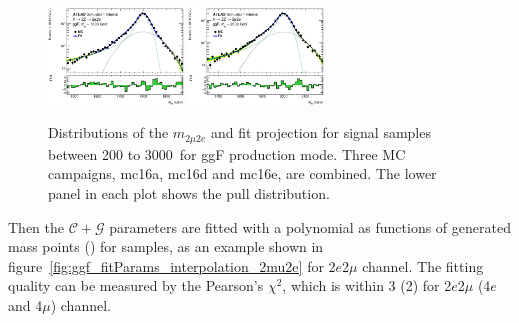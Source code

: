 \begin{figure}[htbp]
    \includegraphics[width=0.32\textwidth]{figures/HMHZZ/signal/ggf_mass_signal_1800_H4l_2mu2e.eps}
    \includegraphics[width=0.32\textwidth]{figures/HMHZZ/signal/ggf_mass_signal_2000_H4l_2mu2e.eps}
    \caption{Distributions of the $m_{2\mu 2e}$ and fit projection for signal samples between 200 to 3000~\gev for ggF production mode. 
    Three MC campaigns, mc16a, mc16d and mc16e, are combined. 
    The lower panel in each plot shows the pull distribution.}
    \label{fig:ggf_mass_signalParam_2mu2e}
\end{figure}

Then the $\mathcal{C}+\mathcal{G}$ parameters are fitted with a polynomial as functions of generated mass points (\mH) for samples, as an example shown in figure~\ref{fig:ggf_fitParams_interpolation_2mu2e} for 2$e$2$\mu$ channel.
The fitting quality can be measured by the Pearson’s $\chi^2$, which is within 3 (2) for 2$e$2$\mu$ (4$e$ and 4$\mu$) channel.

